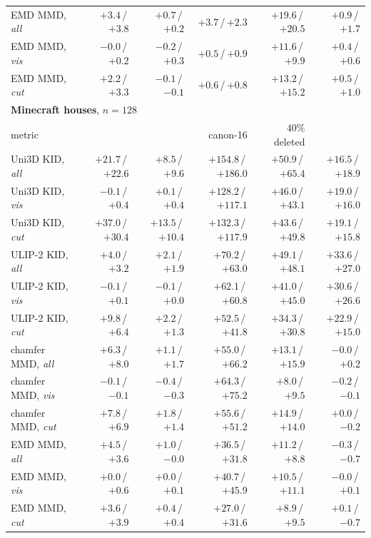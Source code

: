 \begin{table}[t]
\begin{tabular}{lrrrrr}
EMD MMD, \emph{all} & $+3.4$\,/\,$+3.8$ & $+0.7$\,/\,$+0.2$ & $+3.7$\,/\,$+2.3$ & $+19.6$\,/\,$+20.5$ & $+0.9$\,/\,$+1.7$ \\
EMD MMD, \emph{vis} & $-0.0$\,/\,$+0.2$ & $-0.2$\,/\,$+0.3$ & $+0.5$\,/\,$+0.9$ & $+11.6$\,/\,$+9.9$ & $+0.4$\,/\,$+0.6$ \\
EMD MMD, \emph{cut} & $+2.2$\,/\,$+3.3$ & $-0.1$\,/\,$-0.1$ & $+0.6$\,/\,$+0.8$ & $+13.2$\,/\,$+15.2$ & $+0.5$\,/\,$+1.0$ \\
\midrule
\multicolumn{6}{l}{\textbf{Minecraft houses}, $n{=}128$} \\
metric & \solidify{} & \hollow{} & canon-16 & $40\%$ deleted & \matshuffle{} \\
\midrule
Uni3D KID, \emph{all} & $+21.7$\,/\,$+22.6$ & $+8.5$\,/\,$+9.6$ & $+154.8$\,/\,$+186.0$ & $+50.9$\,/\,$+65.4$ & $+16.5$\,/\,$+18.9$ \\
Uni3D KID, \emph{vis} & $-0.1$\,/\,$+0.4$ & $+0.1$\,/\,$+0.4$ & $+128.2$\,/\,$+117.1$ & $+46.0$\,/\,$+43.1$ & $+19.0$\,/\,$+16.0$ \\
Uni3D KID, \emph{cut} & $+37.0$\,/\,$+30.4$ & $+13.5$\,/\,$+10.4$ & $+132.3$\,/\,$+117.9$ & $+43.6$\,/\,$+49.8$ & $+19.1$\,/\,$+15.8$ \\
ULIP-2 KID, \emph{all} & $+4.0$\,/\,$+3.2$ & $+2.1$\,/\,$+1.9$ & $+70.2$\,/\,$+63.0$ & $+49.1$\,/\,$+48.1$ & $+33.6$\,/\,$+27.0$ \\
ULIP-2 KID, \emph{vis} & $-0.1$\,/\,$+0.1$ & $-0.1$\,/\,$+0.0$ & $+62.1$\,/\,$+60.8$ & $+41.0$\,/\,$+45.0$ & $+30.6$\,/\,$+26.6$ \\
ULIP-2 KID, \emph{cut} & $+9.8$\,/\,$+6.4$ & $+2.2$\,/\,$+1.3$ & $+52.5$\,/\,$+41.8$ & $+34.3$\,/\,$+30.8$ & $+22.9$\,/\,$+15.0$ \\
chamfer MMD, \emph{all} & $+6.3$\,/\,$+8.0$ & $+1.1$\,/\,$+1.7$ & $+55.0$\,/\,$+66.2$ & $+13.1$\,/\,$+15.9$ & $-0.0$\,/\,$+0.2$ \\
chamfer MMD, \emph{vis} & $-0.1$\,/\,$-0.1$ & $-0.4$\,/\,$-0.3$ & $+64.3$\,/\,$+75.2$ & $+8.0$\,/\,$+9.5$ & $-0.2$\,/\,$-0.1$ \\
chamfer MMD, \emph{cut} & $+7.8$\,/\,$+6.9$ & $+1.8$\,/\,$+1.4$ & $+55.6$\,/\,$+51.2$ & $+14.9$\,/\,$+14.0$ & $+0.0$\,/\,$-0.2$ \\
EMD MMD, \emph{all} & $+4.5$\,/\,$+3.6$ & $+1.0$\,/\,$-0.0$ & $+36.5$\,/\,$+31.8$ & $+11.2$\,/\,$+8.8$ & $-0.3$\,/\,$-0.7$ \\
EMD MMD, \emph{vis} & $+0.0$\,/\,$+0.6$ & $+0.0$\,/\,$+0.1$ & $+40.7$\,/\,$+45.9$ & $+10.5$\,/\,$+11.1$ & $-0.0$\,/\,$+0.1$ \\
EMD MMD, \emph{cut} & $+3.6$\,/\,$+3.9$ & $+0.4$\,/\,$+0.4$ & $+27.0$\,/\,$+31.6$ & $+8.9$\,/\,$+9.5$ & $+0.1$\,/\,$-0.7$ \\
\bottomrule
\end{tabular}
\end{table}

